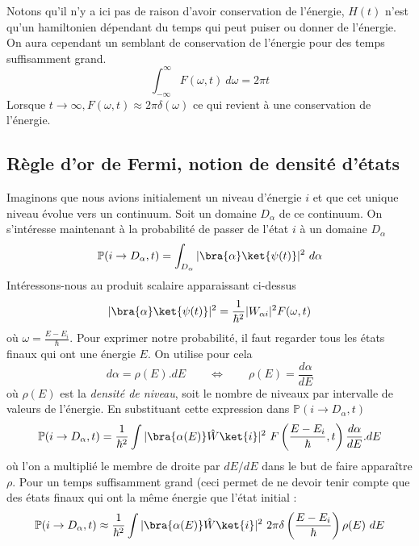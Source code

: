 		Notons qu'il n'y a ici pas de raison d'avoir conservation de l'énergie, $H(t)$ n'est qu'un 
		hamiltonien dépendant du temps qui peut puiser ou donner de l'énergie. On aura cependant un 
		semblant de conservation de l'énergie pour des temps suffisamment grand.
		\begin{equation}
		\int_{-\infty}^\infty F(\omega,t)\ d\omega = 2\pi t
		\end{equation}
		Lorsque $t\rightarrow\infty, F(\omega,t)\approx 2\pi\delta(\omega)$ ce qui revient à une conservation 
		de l'énergie.


	\subsection{Règle d'or de Fermi, notion de densité d'états}
	Imaginons que nous avions initialement un niveau d'énergie $i$ et que cet unique niveau évolue 
	vers un continuum. Soit un domaine $D_\alpha$ de ce continuum. On s'intéresse maintenant à la 
	probabilité de passer de l'état $i$ à un domaine $D_\alpha$
	\begin{equation}
	\mathbb{P}(i\rightarrow D_\alpha,t) = \int_{D_\alpha} |\bra{\alpha}\ket{\psi(t)}|^2\ d\alpha
	\end{equation}
	Intéressons-nous au produit scalaire apparaissant ci-dessus
	\begin{equation}
	|\bra{\alpha}\ket{\psi(t)}|^2 = \frac{1}{\hbar^2}|W_{\alpha i}|^2F(\omega,t)
	\end{equation}
	où $\omega = \frac{E-E_i}{\hbar}$. Pour exprimer notre probabilité, il faut regarder tous les 
	états finaux qui ont une énergie $E$. On utilise pour cela
	\begin{equation}
	d\alpha = \rho(E).dE\qquad\Leftrightarrow\qquad \rho(E) = \dfrac{d\alpha}{dE}
	\end{equation}
	où $\rho(E)$ est la \textit{densité de niveau}, soit le nombre de niveaux par intervalle de valeurs 
	de l'énergie. En substituant cette expression dans $\mathbb{P}(i\rightarrow D_\alpha,t)$
	\begin{equation}
	\mathbb{P}(i\rightarrow D_\alpha,t) = \frac{1}{\hbar^2}\int |\bra{\alpha(E)}\hat{W}\ket{i}|^2\ F
	\left(\frac{E-E_i}{\hbar},t\right)\dfrac{d\alpha}{dE}.dE
	\end{equation}
	où l'on a multiplié le membre de droite par $dE/dE$ dans le but de faire apparaître $\rho$. Pour 
	un temps suffisamment grand (ceci permet de ne devoir tenir compte que des états finaux qui ont 
	la même énergie que l'état initial :
	\begin{equation}
	\mathbb{P}(i\rightarrow D_\alpha,t) \approx  \frac{1}{\hbar^2}\int |\bra{\alpha(E)}\hat{W}\ket{i}|^2\
	 2\pi	\delta\left(\frac{E-E_i}{\hbar}\right)\rho(E)\ dE
	\end{equation}
